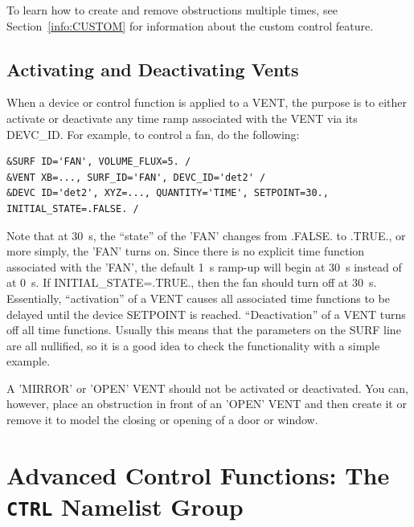 \documentclass[11pt]{book}
\begin{document}
To learn how to create and remove obstructions multiple times, see Section~\ref{info:CUSTOM} for information about the custom control feature.



\subsection{Activating and Deactivating Vents}
\label{info:activate_deactivate}

When a device or control function is applied to a {\ct VENT}, the purpose is to either activate or deactivate any time ramp associated with
the {\ct VENT} via its {\ct DEVC\_ID}. For example, to control a fan, do the following:
\begin{lstlisting}
&SURF ID='FAN', VOLUME_FLUX=5. /
&VENT XB=..., SURF_ID='FAN', DEVC_ID='det2' /
&DEVC ID='det2', XYZ=..., QUANTITY='TIME', SETPOINT=30., INITIAL_STATE=.FALSE. /
\end{lstlisting}
Note that at 30~s, the ``state'' of the {\ct 'FAN'} changes from {\ct .FALSE.} to {\ct .TRUE.}, or more simply, the {\ct 'FAN'} turns on. Since there
is no explicit time function associated with the {\ct 'FAN'}, the default 1~s ramp-up will begin at 30~s instead of at 0~s. If {\ct INITIAL\_STATE=.TRUE.}, then the fan should turn off at 30~s. Essentially, ``activation'' of a {\ct VENT} causes all associated
time functions to be delayed until the device {\ct SETPOINT} is reached. ``Deactivation'' of a {\ct VENT} turns off all time functions. Usually this means
that the parameters on the {\ct SURF} line are all nullified, so it is a good idea to check the functionality with a simple example.



A {\ct 'MIRROR'} or {\ct 'OPEN'} {\ct VENT} should not be activated or deactivated.
You can, however, place an obstruction in front of an {\ct 'OPEN'} {\ct VENT} and then create it or remove it to model the closing or opening of a door or
window.






\section{Advanced Control Functions: The \texorpdfstring{{\tt CTRL}}{CTRL} Namelist Group}
\label{info:CTRL}
\end{document}
